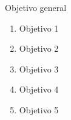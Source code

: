 

Objetivo general


\newcommand{\oeOne}{Objetivo 1}
\newcommand{\oeTwo}{Objetivo 2}
\newcommand{\oeThree}{Objetivo 3}
\newcommand{\oeFour}{Objetivo 4}
\newcommand{\oeFive}{Objetivo 5}
\begin{enumerate}
  \item \oeOne
  \item \oeTwo
  \item \oeThree
  \item \oeFour
  \item \oeFive
\end{enumerate}
